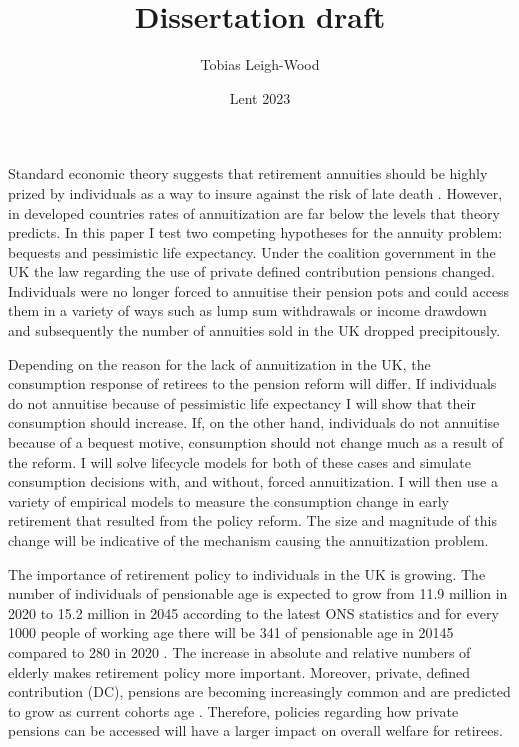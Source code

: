 \documentclass[12pt]{article}
\date{Lent 2023}
\title{Dissertation draft}
\author{Tobias Leigh-Wood}
\begin{document}
\maketitle


Standard economic theory suggests that retirement annuities should be highly prized by individuals as a way to
insure against the risk of late death \cite{yaari_65}. However, in developed countries rates of annuitization are far below the
levels that theory predicts. In this paper I test two competing hypotheses for the annuity problem: bequests and
pessimistic life expectancy. Under the coalition government in the UK the law regarding the use of private defined
contribution pensions changed. Individuals were no longer forced to annuitise their pension pots and could access
them in a variety of ways such as lump sum withdrawals or income drawdown and subsequently the number of annuities
sold in the UK dropped precipitously.

Depending on the reason for the lack of annuitization in the UK, the consumption response of retirees to the pension
reform will differ. If individuals do not annuitise because of pessimistic life expectancy I will show that their
consumption should increase. If, on the other hand, individuals do not annuitise because of a bequest motive, consumption
should not change much as a result of the reform. I will solve lifecycle models for both of these cases and simulate
consumption decisions with, and without, forced annuitization. I will then use a variety of empirical models to measure
the consumption change in early retirement that resulted from the policy reform. The size and magnitude of this change
will be indicative of the mechanism causing the annuitization problem.

The importance of retirement policy to individuals in the UK is growing. The number of individuals of
pensionable age is expected to grow from 11.9 million in 2020 to 15.2 million in
2045 according to the latest ONS statistics and for every 1000 people of working age there will be 341 of pensionable
age in 20145 compared to 280 in 2020 \cite{ons_population_predictions_2020}. The increase in absolute and relative
numbers of elderly makes retirement policy more important. Moreover, private, defined contribution (DC), pensions are
becoming increasingly common and are predicted to grow as current cohorts age \cite{cribb_karjalainen_ifs_2023}.
Therefore, policies regarding how private pensions can be accessed will have a larger impact on overall welfare for
retirees.
\end{document}

